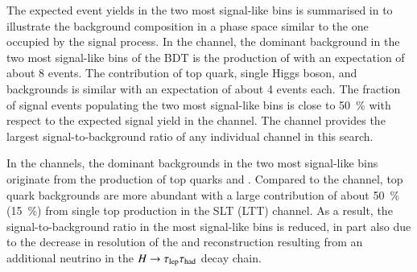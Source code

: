 The expected event yields in the two most signal-like bins is summarised in
 to illustrate the background
composition in a phase space similar to the one occupied by the signal process.
In the \hadhad channel, the dominant background in the two most signal-like bins
of the BDT is the production of \ZHF with an expectation of about 8 events. The
contribution of top quark, single Higgs boson, and \faketauhadvis backgrounds is
similar with an expectation of about 4 events each. The fraction of signal
events populating the two most signal-like bins is close to \SI{50}{\percent}
with respect to the expected signal yield in the channel. The \hadhad channel
provides the largest signal-to-background ratio of any individual channel in
this search.

In the \lephad channels, the dominant backgrounds in the two most signal-like
bins originate from the production of top quarks and \ZHF. Compared to the
\hadhad channel, top quark backgrounds are more abundant
with a large contribution of about \SI{50}{\percent} (\SI{15}{\percent}) from
single top production in the SLT (LTT) channel. As a result, the
signal-to-background ratio in the most signal-like bins is reduced, in part also
due to the decrease in resolution of the \mMMC and \mHH reconstruction resulting
from an additional neutrino in the $H \to \tau_{\text{lep}}\tau_{\text{had}}$ decay chain.


